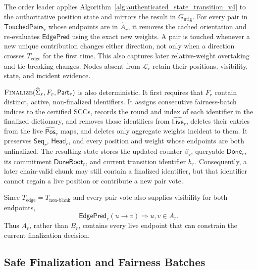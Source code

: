 The order leader applies Algorithm~\ref{alg:authenticated_state_transition_v4}
to the authoritative position state and mirrors the result in
$G_{\mathrm{utig}}$.  For every pair in $\mathsf{TouchedPairs}_r$ whose endpoints
are in $\widehat A_r$, it removes the cached orientation and re-evaluates
$\mathsf{EdgePred}$ using the exact new weights.  A pair is touched whenever a
new unique contribution changes either direction, not only when a direction
crosses $T_{\mathrm{edge}}$ for the first time.  This also captures later
relative-weight overtaking and tie-breaking changes.  Nodes absent from
$\mathcal L_r$ retain their positions, visibility, state, and incident
evidence.

$\textsc{Finalize}(\widehat\Sigma_r,F_r,\mathsf{Part}_r)$ is also deterministic.  It first
requires that $F_r$ contain distinct, active, non-finalized identifiers.  It
assigns consecutive fairness-batch indices to the certified SCCs, records the
round and index of each identifier in the finalized dictionary, and removes
those identifiers from
$\widehat{\mathsf{Live}}_r$, deletes their entries from the live
$\widehat{\mathsf{Pos}}_r$ maps, and deletes only aggregate weights incident
to them.  It preserves $\mathsf{Seq}_r$, $\mathsf{Head}_r$, and every position
and weight whose endpoints are both unfinalized.  The resulting state stores
the updated counter $\beta_r$, queryable $\mathsf{Done}_r$, its commitment
$\mathsf{DoneRoot}_r$, and current transition identifier $h_r$.
Consequently, a later chain-valid chunk may still contain a finalized
identifier, but that identifier cannot regain a live position or contribute a
new pair vote.

Since $T_{\mathrm{edge}}=T_{\mathrm{non\mbox{-}blank}}$ and every pair vote
also supplies visibility for both endpoints,
\[
 \mathsf{EdgePred}_r(u\to v)\Longrightarrow u,v\in A_r.
 \tag{10}\label{eq:edge-active-closure}
\]
Thus $A_r$, rather than $B_r$, contains every live endpoint that can constrain
the current finalization decision.

\subsection{Safe Finalization and Fairness Batches}
\label{sec:safe-extraction-v4}

